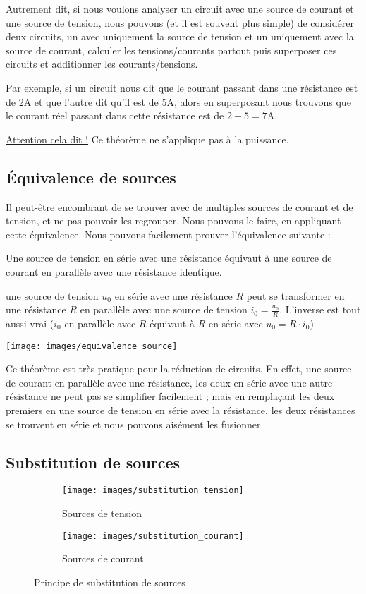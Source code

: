 \documentclass[12pt,a4paper]{article}
\begin{document}
Autrement dit, si nous voulons analyser un circuit avec une source de courant et une source de tension, nous pouvons (et il est souvent plus simple) de considérer deux circuits, un avec uniquement la source de tension et un uniquement avec la source de courant, calculer les tensions/courants partout puis superposer ces circuits et additionner les courants/tensions. 

Par exemple, si un circuit nous dit que le courant passant dans une résistance est de 2A et que l'autre dit qu'il est de 5A, alors en superposant nous trouvons que le courant réel passant dans cette résistance est de $2+5 = 7$A.

\uline{Attention cela dit !} Ce théorème ne s'applique pas à la puissance.

\subsection{Équivalence de sources}
Il peut-être encombrant de se trouver avec de multiples sources de courant et de tension, et ne pas pouvoir les regrouper. Nous pouvons le faire, en appliquant cette équivalence. Nous pouvons facilement prouver l'équivalence suivante : 
\begin{boite}
	Une source de tension en série avec une résistance équivaut à une source de courant en parallèle avec une résistance identique.
\end{boite}
\begin{exemple}
	une source de tension $u_0$ en série avec une résistance $R$ peut se transformer en une résistance $R$ en parallèle avec une source de tension $i_0 = \frac{u_0}{R}$. L'inverse est tout aussi vrai ($i_0$ en parallèle avec $R$ équivaut à $R$ en série avec $u_0 = R\cdot i_0$)
	\begin{center}
		\texttt{[image: images/equivalence\_source]}
	\end{center}
\end{exemple} 
Ce théorème est très pratique pour la réduction de circuits. En effet, une source de courant en parallèle avec une résistance, les deux en série avec une autre résistance ne peut pas se simplifier facilement ; mais en remplaçant les deux premiers en une source de tension en série avec la résistance, les deux résistances se trouvent en série et nous pouvons aisément les fusionner.

\subsection{Substitution de sources}
\begin{figure}[!h]
	\centering
	\begin{subfigure}[b]{0.45\textwidth}
		\centering
		\texttt{[image: images/substitution\_tension]}
		\caption{Sources de tension}
	\end{subfigure}
	\begin{subfigure}[b]{0.45\textwidth}
		\centering
		\texttt{[image: images/substitution\_courant]}
		\caption{Sources de courant}
	\end{subfigure}
	\caption{Principe de substitution de sources}
\end{figure}
\end{document}
